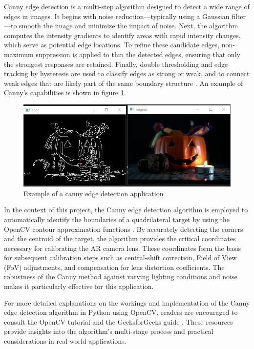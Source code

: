 \noindent Canny edge detection is a multi-step algorithm designed to detect a wide range of edges in images. It begins with noise reduction—typically using a Gaussian filter—to smooth the image and minimize the impact of noise. Next, the algorithm computes the intensity gradients to identify areas with rapid intensity changes, which serve as potential edge locations. To refine these candidate edges, non-maximum suppression is applied to thin the detected edges, ensuring that only the strongest responses are retained. Finally, double thresholding and edge tracking by hysteresis are used to classify edges as strong or weak, and to connect weak edges that are likely part of the same boundary structure \cite{opencv_canny, geeksforgeeks_canny}. An example of Canny's capabilities is shown in figure \ref{fig:pumpkin}.
\begin{figure}[h]
    \centering
    \includegraphics[width=\textwidth]{Images/03edgedetect/pumpkin.png}
    \caption{Example of a canny edge detection application \cite{geeksforgeeks_canny}}
    \label{fig:pumpkin}
\end{figure}


\noindent In the context of this project, the Canny edge detection algorithm is employed to automatically identify the boundaries of a quadrilateral target by using the OpenCV contour approximation functions \cite{contour_approximation, contour}. By accurately detecting the corners and the centroid of the target, the algorithm provides the critical coordinates necessary for calibrating the AR camera lens. These coordinates form the basis for subsequent calibration steps such as central-shift correction, Field of View (FoV) adjustments, and compensation for lens distortion coefficients. The robustness of the Canny method against varying lighting conditions and noise makes it particularly effective for this application.

\noindent For more detailed explanations on the workings and implementation of the Canny edge detection algorithm in Python using OpenCV, readers are encouraged to consult the OpenCV tutorial \cite{opencv_canny} and the GeeksforGeeks guide \cite{geeksforgeeks_canny}. These resources provide insights into the algorithm's multi-stage process and practical considerations in real-world applications.

